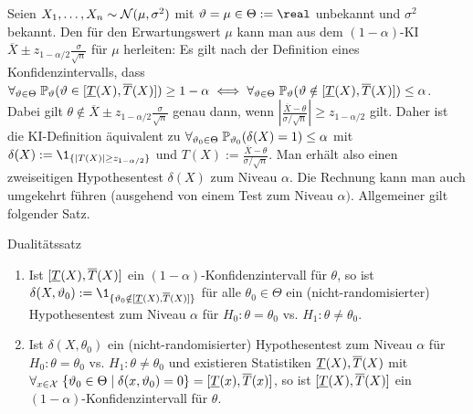 \begin{Bsp}
    Seien $X_1, \dotsc, X_n \sim \mathcal{N}(\mu, \sigma^2)$ mit $\theta = \mu \in \Theta := \real$
    unbekannt und $\sigma^2$ bekannt.
    Den  für den Erwartungswert $\mu$ kann man
    aus dem $(1 - \alpha)$-KI $\overline{X} \pm z_{1-\alpha/2}
    \frac{\sigma}{\sqrt{n}}$ für $\mu$ herleiten:
    Es gilt nach der Definition eines Konfidenzintervalls, dass\\
    $\forall_{\vartheta \in \Theta}\; \mathbb{P}_\vartheta(\vartheta \in [\underline{T}(X), \overline{T}(X)]) \ge 1 - \alpha
    \iff \forall_{\vartheta \in \Theta}\; \mathbb{P}_\vartheta(\vartheta \notin [\underline{T}(X), \overline{T}(X)]) \le \alpha$.
    Dabei gilt $\theta \notin \overline{X} \pm z_{1-\alpha/2} \frac{\sigma}{\sqrt{n}}$
    genau dann, wenn $\left|\frac{\overline{X} - \theta}{\sigma/\sqrt{n}}\right| \ge
    z_{1-\alpha/2}$ gilt.
    Daher ist die KI-Definition äquivalent zu
    $\forall_{\vartheta_0 \in \Theta}\; \mathbb{P}_{\vartheta_0}(\delta(X) = 1) \le \alpha$
    mit $\delta(X) := \1_{\{|T(X)| \ge z_{1-\alpha/2}\}}$ und
    $T(X) := \frac{\overline{X} - \theta}{\sigma/\sqrt{n}}$.
    Man erhält also einen zweiseitigen Hypothesentest $\delta(X)$ zum Niveau $\alpha$.
    Die Rechnung kann man auch umgekehrt führen (ausgehend von einem Test zum Niveau $\alpha)$.
    Allgemeiner gilt folgender Satz.
\end{Bsp}

\begin{Satz}{Dualitätssatz}
    \begin{enumerate}[label=\emph{\alph*)}]
        \item
        Ist $[\underline{T}(X), \overline{T}(X)]$ ein $(1-\alpha)$-Konfidenzintervall für $\theta$,
        so ist $\delta(X, \theta_0) := \1_{\{\theta_0 \notin [\Tu(X), \To(X)]\}}$ für alle
        $\theta_0 \in \Theta$ ein (nicht-randomisierter) Hypothesentest zum Niveau $\alpha$
        für $H_0\colon \theta = \theta_0$ vs. $H_1\colon \theta \not= \theta_0$.

        \item
        Ist $\delta(X, \theta_0)$ ein (nicht-randomisierter) Hypothesentest zum Niveau $\alpha$
        für $H_0\colon \theta = \theta_0$ vs. $H_1\colon \theta \not= \theta_0$
        und existieren Statistiken $\underline{T}(X), \overline{T}(X)$ mit
        $\forall_{x \in \mathcal{X}}\; \{\vartheta_0 \in \Theta \;|\; \delta(x, \vartheta_0) = 0\} =
        [\underline{T}(x), \overline{T}(x)]$,
        so ist $[\underline{T}(X), \overline{T}(X)]$ ein $(1-\alpha)$-Konfidenzintervall für $\theta$.
    \end{enumerate}
\end{Satz}

